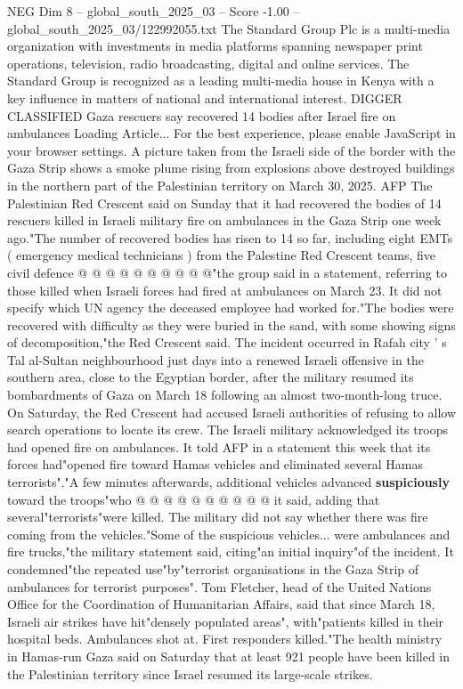 \begin{textsample}{NEG Dim 8 – global\_south\_2025\_03 – Score -1.00 – global\_south\_2025\_03/122992055.txt}  \label{ex:f8_neg_077}
The Standard Group Plc is a multi-media organization with investments in media platforms spanning newspaper print operations, television, radio broadcasting, digital and online services.
The Standard Group is recognized as a leading multi-media house in Kenya with a key influence in matters of national and international interest.
DIGGER CLASSIFIED Gaza rescuers say recovered 14 bodies after Israel fire on ambulances Loading Article...
For the best experience, please enable JavaScript in your browser settings.
A picture taken from the Israeli side of the border with the Gaza Strip shows a smoke plume rising from explosions above destroyed buildings in the northern part of the Palestinian territory on March 30, 2025.
AFP The Palestinian Red Crescent said on Sunday that it had recovered the bodies of 14 rescuers killed in Israeli military fire on ambulances in the Gaza Strip one week ago."The number of recovered bodies has risen to 14 so far, including eight EMTs ( emergency medical technicians ) from the Palestine Red Crescent teams, five civil defence @ @ @ @ @ @ @ @ @ @"the group said in a statement, referring to those killed when Israeli forces had fired at ambulances on March 23.
It did not specify which UN agency the deceased employee had worked for."The bodies were recovered with difficulty as they were buried in the sand, with some showing signs of decomposition,"the Red Crescent said.
The incident occurred in Rafah city ' s Tal al-Sultan neighbourhood just days into a renewed Israeli offensive in the southern area, close to the Egyptian border, after the military resumed its bombardments of Gaza on March 18 following an almost two-month-long truce.
On Saturday, the Red Crescent had accused Israeli authorities of refusing to allow search operations to locate its crew.
The Israeli military acknowledged its troops had opened fire on ambulances.
It told AFP in a statement this week that its forces had"opened fire toward Hamas vehicles and eliminated several Hamas terrorists"."A few minutes afterwards, additional vehicles advanced \textbf{suspiciously} toward the troops"who @ @ @ @ @ @ @ @ @ @ it said, adding that several"terrorists"were killed.
The military did not say whether there was fire coming from the vehicles."Some of the suspicious vehicles... were ambulances and fire trucks,"the military statement said, citing"an initial inquiry"of the incident.
It condemned"the repeated use"by"terrorist organisations in the Gaza Strip of ambulances for terrorist purposes".
Tom Fletcher, head of the United Nations Office for the Coordination of Humanitarian Affairs, said that since March 18, Israeli air strikes have hit"densely populated areas", with"patients killed in their hospital beds.
Ambulances shot at.
First responders killed."The health ministry in Hamas-run Gaza said on Saturday that at least 921 people have been killed in the Palestinian territory since Israel resumed its large-scale strikes.

\end{textsample}
